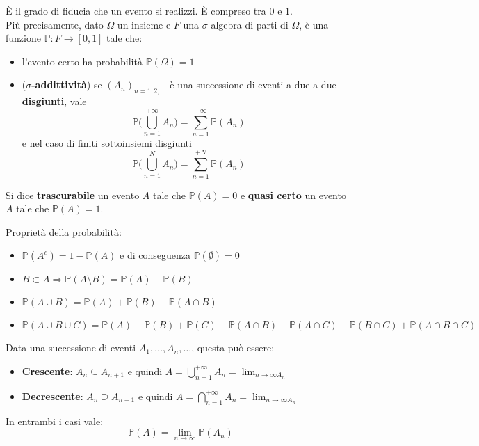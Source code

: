 \begin{definition}[Probabilità]
	È il grado di fiducia che un evento si realizzi. È compreso tra $0$ e $1$.\\
	Più precisamente, dato $\Omega$ un insieme e $F$ una $\sigma$-algebra di parti di $\Omega$, è una funzione $\mathbb{P}:F\to [0,1]$ tale che:
	\begin{itemize}
		\item l'evento certo ha probabilità $\mathbb{P}(\Omega)=1$
		\item (\textbf{$\sigma$-addittività}) se $(A_n)_{n=1,2,\ldots}$ è una successione di eventi a due a due \textbf{disgiunti}, vale
		\begin{equation}
			\mathbb{P}\bigg(\bigcup_{n=1}^{+\infty}A_n\bigg) = \sum_{n=1}^{+\infty}\mathbb{P}(A_n)
		\end{equation}
		e nel caso di finiti sottoinsiemi disgiunti
		\begin{equation}
			\mathbb{P}\bigg(\bigcup_{n=1}^{N}A_n\bigg) = \sum_{n=1}^{+N}\mathbb{P}(A_n)
		\end{equation}
	\end{itemize}
\end{definition}
\begin{note}
	Si dice \textbf{trascurabile} un evento $A$ tale che $\mathbb{P}(A)=0$ e \textbf{quasi certo} un evento $A$ tale che $\mathbb{P}(A)=1$. 
\end{note}
\begin{proposition}
	Proprietà della probabilità:
	\begin{itemize}
		\item $\mathbb{P}(A^c)=1-\mathbb{P}(A)$ e di conseguenza $\mathbb{P}(\emptyset)=0$
		\item $B \subset A \Longrightarrow \mathbb{P}(A\setminus B)=\mathbb{P}(A) - \mathbb{P}(B)$
		\item $\mathbb{P}(A\cup B)=\mathbb{P}(A)+\mathbb{P}(B)-\mathbb{P}(A \cap B)$
		\item $\mathbb{P}(A \cup B \cup C) = \mathbb{P}(A) + \mathbb{P}(B) + \mathbb{P}(C) - \mathbb{P}(A \cap B) - \mathbb{P}(A \cap C) - \mathbb{P}(B \cap C) + \mathbb{P}(A \cap B \cap C)$
	\end{itemize}
\end{proposition}
\begin{proposition}
	Data una successione di eventi $A_1, \ldots, A_n, \ldots$, questa può essere:
	\begin{itemize}
		\item \textbf{Crescente}: $A_n \subseteq A_{n+1}$ e quindi $A = \bigcup_{n=1}^{+\infty}A_n = \lim_{n \to  \infty A_n}$
		\item \textbf{Decrescente}: $A_n  \supseteq A_{n+1}$ e quindi $A = \bigcap_{n=1}^{+\infty}A_n = \lim_{n \to  \infty A_n}$
	\end{itemize}
	In entrambi i casi vale:
	\begin{equation}
		\mathbb{P}(A) = \lim_{n \to \infty}\mathbb{P}(A_n)
	\end{equation}
\end{proposition}

